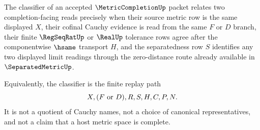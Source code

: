 \begin{definition}
\label{def:metric-completion-classifier}
The classifier of an accepted $\MetricCompletionUp$ packet relates two completion-facing reads precisely when their source metric row is the same displayed $X$, their cofinal Cauchy evidence is read from the same $F$ or $D$ branch, their finite $\RegSeqRatUp$ or $\RealUp$ tolerance rows agree after the componentwise $\hsame$ transport $H$, and the separatedness row $S$ identifies any two displayed limit readings through the zero-distance route already available in $\SeparatedMetricUp$.

Equivalently, the classifier is the finite replay path
$$
X,(F\ \hbox{or}\ D),R,S,H,C,P,N .
$$
It is not a quotient of Cauchy names, not a choice of canonical representatives, and not a claim that a host metric space is complete.
\end{definition}

